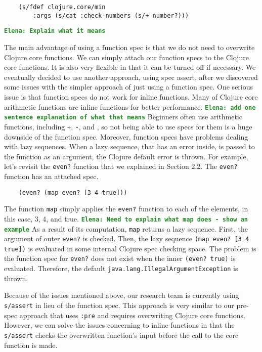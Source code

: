 \documentclass[12pt]{article}
\newcommand{\comment}[1]{{\bf \tt  {#1}}}
\newcommand{\emcomment}[1]{\textcolor{ForestGreen}{\comment{Elena: {#1}}}}
\begin{document}
	\begin{verbatim}
	(s/fdef clojure.core/min
		:args (s/cat :check-numbers (s/+ number?)))
	\end{verbatim}
	\emcomment{Explain what it means}

	The main advantage of using a function spec is that we do not need to overwrite Clojure core functions. We can simply attach our 
	function specs to the Clojure core functions. It is also very flexible in that it can be turned off if necessary. 
	We eventually decided to use another approach, using spec assert, after we 
	discovered some issues with the simpler approach of just using a function spec. 
	One serious issue is that function specs do not work for inline functions.
	Many of Clojure core arithmetic functions are inline functions for better performance.
	\emcomment{add one sentence explanation of what that means}
	Beginners often use arithmetic functions, including {\tt +}, {\tt -}, and {\tt *}, 
	so not being able to use specs for them is a huge downside of the function spec. 
	Moreover, function specs have problems dealing with lazy sequences. When a lazy sequence, 
	that has an error inside, is passed to the function as an argument, the Clojure default error is thrown. 
	For example, let's revisit the {\tt even?} function that we explained in Section 2.2. 
	The {\tt even?} function has an attached spec.
	\begin{verbatim}
	(even? (map even? [3 4 true]))
	\end{verbatim}
	The function {\tt map} simply applies the {\tt even?} function to each of the elements, in this case, 3, 4, and true.
	\emcomment{Need to explain what map does - show an example}
	As a result of its computation, {\tt map} returns a lazy sequence.
	First, the argument of outer {\tt even?} is checked. Then, the lazy sequence {\tt (map even? [3 4 true])} is
	evaluated in some internal Clojure spec checking space. The problem is the function spec for {\tt even?} does not exist
	when the inner {\tt (even? true)} is evaluated. Therefore, the default {\tt java.lang.IllegalArgumentException} is thrown.

	Because of the issues mentioned above, our research team is currently using {\tt s/assert} in lieu of the function spec.
	This approach is very similar to our pre-spec approach that uses {\tt :pre} and requires overwriting 
	Clojure core functions. However, we can solve the issues concerning to inline functions in that 
	the {\tt s/assert} checks the overwritten function's input before the call to the core function is made. 
	
\end{document}
